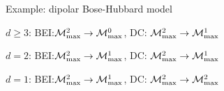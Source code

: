 \documentclass{beamer}
\newcommand{\M}[1]{\mathcal{M}_{\rm max}^{#1}}
\begin{document}
\begin{frame}[t]{Example: dipolar Bose-Hubbard model}
\setlength{\leftskip}{1cm}

$d\ge 3$: BEI:$\M{2} \rightarrow \M{0}$, DC: $\M{2} \rightarrow \M{1}$

$d=2$: BEI:$\M{2} \rightarrow \M{1}$, DC: $\M{2} \rightarrow \M{1}$

$d=1$: BEI:$\M{2} \rightarrow \M{1}$, DC: $\M{2} \rightarrow \M{2}$
\end{frame}
\end{document}
